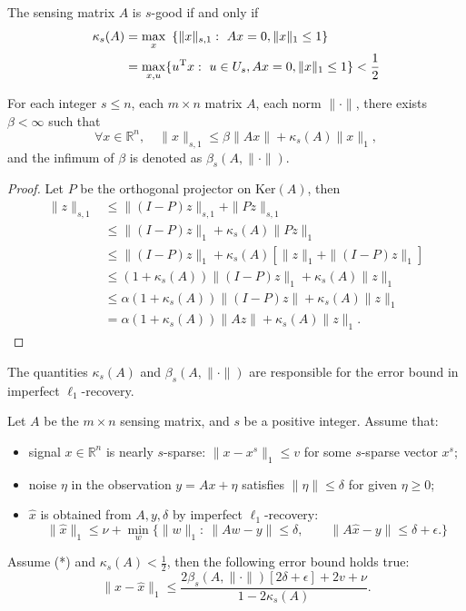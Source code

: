 \begin{lemma}
The sensing matrix $A$ is $s$-good if and only if
\begin{align*}
\kappa_s(A)&=\max_{x}~\left\{
\|x\|_{s,1}:~Ax=0, \|x\|_1\le 1
\right\}\\
&=\max_{x,u}\{u^{\mathrm T} x:~u\in U_s, Ax=0, \|x\|_1\le 1\}<\frac{1}{2}
\end{align*}
\end{lemma}
\begin{lemma}
For each integer $s\le n$, each $m\times n$ matrix $A$, each norm $\|\cdot\|$,
there exists $\beta<\infty$ such that
\begin{equation}
\tag{*}
\forall x\in\mathbb{R}^n,\quad
\|x\|_{s,1}\le\beta\|Ax\| + \kappa_s(A)\|x\|_1,
\end{equation}
and the infimum of $\beta$ is denoted as $\beta_s(A,\|\cdot\|)$.
\end{lemma}
\begin{proof}
Let $P$ be the orthogonal projector on $\text{Ker}(A)$, then
\begin{align*}
\|z\|_{s,1}&\le \|(I-P)z\|_{s,1} + \|Pz\|_{s,1}\\
&\le \|(I-P)z\|_1 + \kappa_s(A)\|Pz\|_1\\
&\le  \|(I-P)z\|_1 + \kappa_s(A)[\|z\|_1 + \|(I-P)z\|_1]\\
&\le (1+ \kappa_s(A))\|(I-P)z\|_1 + \kappa_s(A)\|z\|_1\\
&\le \alpha(1+ \kappa_s(A))\|(I-P)z\| + \kappa_s(A)\|z\|_1\\
&=\alpha(1+ \kappa_s(A))\|Az\| + \kappa_s(A)\|z\|_1.
\end{align*}
\end{proof}
The quantities $\kappa_s(A)$ and $\beta_s(A,\|\cdot\|)$ are responsible for the error bound in imperfect $\ell_1$-recovery.
\begin{theorem}
Let $A$ be the $m\times n$ sensing matrix, and $s$ be a positive integer. 
Assume that:
\begin{itemize}
\item
signal $x\in\mathbb{R}^n$ is nearly $s$-sparse: $\|x - x^s\|_1\le v$ for some $s$-sparse vector $x^s$;
\item
noise $\eta$ in the observation $y=Ax+\eta$ satisfies $\|\eta\|\le\delta$ for given $\eta\ge0$;
\item
$\hat{x}$ is obtained from $A,y,\delta$ by imperfect $\ell_1$-recovery:
\[
\|\hat{x}\|_1\le \nu + \min_{w}\{
\|w\|_1:~\|Aw-y\|\le\delta,\qquad
\|A\hat{x}-y\|\le\delta+\epsilon.
\}
\]
\end{itemize}
Assume (*) and $\kappa_s(A)<\frac{1}{2}$, then the following error bound holds true:
\[
\|x- \hat{x}\|_1\le 
\frac{2\beta_s(A, \|\cdot\|)[2\delta+\epsilon] + 2v + \nu}{1-2\kappa_s(A)}.
\]
\end{theorem}
